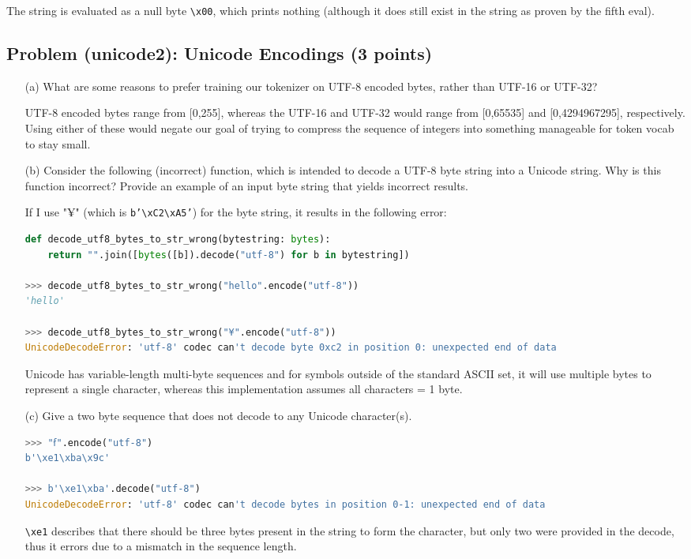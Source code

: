 \documentclass[letterpaper]{article}
\begin{document}
The string is evaluated as a null byte \verb|\x00|, which prints nothing (although it does still exist in the string as proven by the fifth eval).

\subsection{Problem (unicode2): Unicode Encodings (3 points)}

\begin{itemize}
	\item[(a)] What are some reasons to prefer training our tokenizer on UTF-8 encoded bytes, rather than UTF-16 or UTF-32?

UTF-8 encoded bytes range from [0,255], whereas the UTF-16 and UTF-32 would range from [0,65535] and [0,4294967295], respectively. Using either of these would negate our goal of trying to compress the sequence of integers into something manageable for token vocab to stay small.

	\item[(b)] Consider the following (incorrect) function, which is intended to decode a UTF-8 byte string into a Unicode string. Why is this function incorrect? Provide an example of an input byte string that yields incorrect results.

If I use "¥" (which is \texttt{b'\textbackslash xC2\textbackslash xA5'}) for the byte string, it results in the following error:

\begin{lstlisting}[language=Python]
def decode_utf8_bytes_to_str_wrong(bytestring: bytes):
	return "".join([bytes([b]).decode("utf-8") for b in bytestring])

>>> decode_utf8_bytes_to_str_wrong("hello".encode("utf-8"))
'hello'

>>> decode_utf8_bytes_to_str_wrong("¥".encode("utf-8"))
UnicodeDecodeError: 'utf-8' codec can't decode byte 0xc2 in position 0: unexpected end of data
\end{lstlisting}

Unicode has variable-length multi-byte sequences and for symbols outside of the standard ASCII set, it will use multiple bytes to represent a single character, whereas this implementation assumes all characters = 1 byte.

	\item[(c)] Give a two byte sequence that does not decode to any Unicode character(s).

\begin{lstlisting}[language=Python]
>>> "ẜ".encode("utf-8")
b'\xe1\xba\x9c'

>>> b'\xe1\xba'.decode("utf-8")
UnicodeDecodeError: 'utf-8' codec can't decode bytes in position 0-1: unexpected end of data
\end{lstlisting}

\verb|\xe1| describes that there should be three bytes present in the string to form the character, but only two were provided in the decode, thus it errors due to a mismatch in the sequence length.

\end{itemize}
\end{document}
